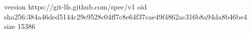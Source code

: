 version https://git-lfs.github.com/spec/v1
oid sha256:384a46ded5144c29e9528c04ff7c8e64f37cae49f4862ac316b8a94da8b46be4
size 15386
